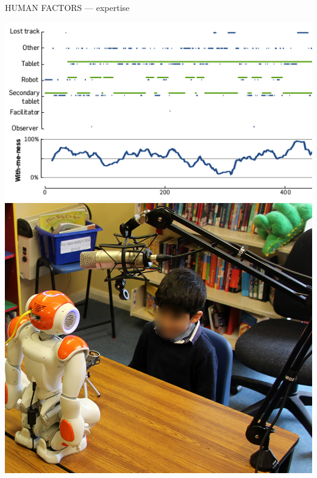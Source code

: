 \documentclass[xcolor=table]{beamer}
\begin{document}
\begin{frame}{HUMAN FACTORS --- expertise}
            \hyperlink{withmeness}{\includegraphics[height=0.2\paperheight]{withmeness/withmeness}}
            \hspace{0.5em}
            \hyperlink{asr}{\includegraphics[height=0.2\paperheight]{speech-reco/record_img}}
            \hspace{0.5em}

\end{frame}
\end{document}
